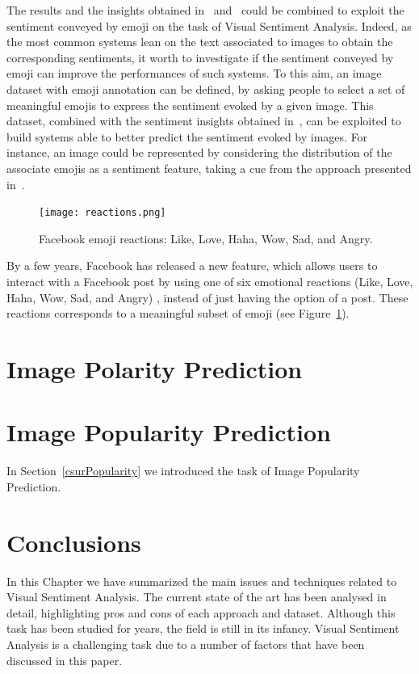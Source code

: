 The results and the insights obtained in~\cite{cappallo2015image2emoji,CappalloTEMP18} and~\cite{novak2015sentiment} could be combined to exploit the sentiment conveyed by emoji on the task of Visual Sentiment Analysis. Indeed, as the most common systems lean on the text associated to images to obtain the corresponding sentiments, it worth to investigate if the sentiment conveyed by emoji can improve the performances of such systems. 
To this aim, an image dataset with emoji annotation can be defined, by asking people to select a set of meaningful emojis to express the sentiment evoked by a given image. This dataset, combined with the sentiment insights obtained in~\cite{novak2015sentiment}, can be exploited to build systems able to better predict the sentiment evoked by images. For instance, an image could be represented by considering the distribution of the associate emojis as a sentiment feature, taking a cue from the approach presented in~\cite{peng2015mixed}.
\begin{figure}
	\centering
	\texttt{[image: reactions.png]}
	\caption{Facebook emoji reactions: Like, Love, Haha, Wow, Sad, and Angry.}
	\label{figReactions}
\end{figure}

By a few years, Facebook has released a new  feature, which allows users to interact with a Facebook post by using one of six emotional reactions (Like, Love, Haha, Wow, Sad, and Angry) , instead of just having the option of  a post. These reactions corresponds to a meaningful subset of emoji (see Figure~\ref{figReactions}).





\section{Image Polarity Prediction}\label{(secPolarity)}

\section{Image Popularity Prediction}\label{secPopularity}
In Section~\ref{csurPopularity} we introduced the task of Image Popularity Prediction.

\section{Conclusions}\label{sentiConclusions}
In this Chapter we have summarized the main issues and techniques related to Visual Sentiment Analysis. The current state of the art has been analysed in detail, highlighting pros and cons of each approach and dataset. Although this task has been studied for years, the field is still in its infancy. Visual Sentiment Analysis is a challenging task due to a number of factors that have been discussed in this paper.

